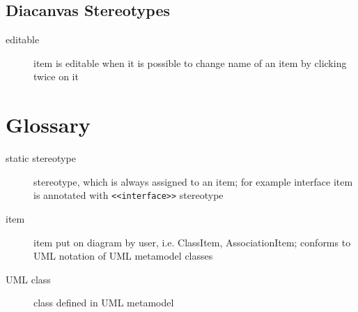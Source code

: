 \documentclass{book}
\newcommand{\rstereotype}[1]{\texttt{<<#1>>}}
\begin{document}
\section{Diacanvas Stereotypes}

\begin{description}
\item[editable] item is editable when it is possible to change name of an
    item by clicking twice on it
\end{description}


\chapter{Glossary}

\begin{description}
\item[static stereotype] stereotype, which is always assigned
    to an item; for example interface item is annotated with
    \rstereotype{interface} stereotype

\item[item] item put on diagram by user, i.e. ClassItem, AssociationItem;
    conforms to UML notation of UML metamodel classes

\item[UML class] class defined in UML metamodel
\end{description}
\end{document}
